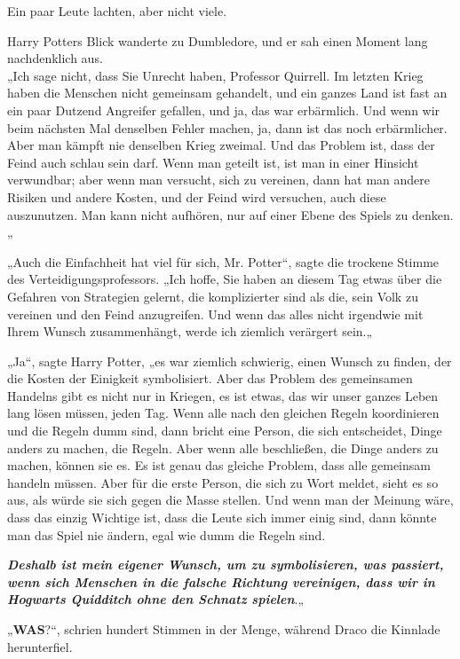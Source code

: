 {Ein paar Leute lachten, aber nicht viele.

Harry Potters Blick wanderte zu Dumbledore, und er sah einen Moment lang nachdenklich aus.\\ „Ich sage nicht, dass Sie Unrecht haben, Professor Quirrell. Im letzten Krieg haben die Menschen nicht gemeinsam gehandelt, und ein ganzes Land ist fast an ein paar Dutzend Angreifer gefallen, und ja, das war erbärmlich. Und wenn wir beim nächsten Mal denselben Fehler machen, ja, dann ist das noch erbärmlicher. Aber man kämpft nie denselben Krieg zweimal. Und das Problem ist, dass der Feind auch schlau sein darf. Wenn man geteilt ist, ist man in einer Hinsicht verwundbar; aber wenn man versucht, sich zu vereinen, dann hat man andere Risiken und andere Kosten, und der Feind wird versuchen, auch diese auszunutzen. Man kann nicht aufhören, nur auf einer Ebene des Spiels zu denken.„

„Auch die Einfachheit hat viel für sich, Mr. Potter“, sagte die trockene Stimme des Verteidigungsprofessors. „Ich hoffe, Sie haben an diesem Tag etwas über die Gefahren von Strategien gelernt, die komplizierter sind als die, sein Volk zu vereinen und den Feind anzugreifen. Und wenn das alles nicht irgendwie mit Ihrem Wunsch zusammenhängt, werde ich ziemlich verärgert sein.„

„Ja“, sagte Harry Potter, „es war ziemlich schwierig, einen Wunsch zu finden, der die Kosten der Einigkeit symbolisiert. Aber das Problem des gemeinsamen Handelns gibt es nicht nur in Kriegen, es ist etwas, das wir unser ganzes Leben lang lösen müssen, jeden Tag. Wenn alle nach den gleichen Regeln koordinieren und die Regeln dumm sind, dann bricht eine Person, die sich entscheidet, Dinge anders zu machen, die Regeln. Aber wenn alle beschließen, die Dinge anders zu machen, können sie es. Es ist genau das gleiche Problem, dass alle gemeinsam handeln müssen. Aber für die erste Person, die sich zu Wort meldet, sieht es so aus, als würde sie sich gegen die Masse stellen. Und wenn man der Meinung wäre, dass das einzig Wichtige ist, dass die Leute sich immer einig sind, dann könnte man das Spiel nie ändern, egal wie dumm die Regeln sind.

\textbf{\emph{Deshalb ist mein eigener Wunsch, um zu symbolisieren, was passiert, wenn sich Menschen in die falsche Richtung vereinigen, dass wir in Hogwarts Quidditch ohne den Schnatz spielen}}.„

„\textbf{WAS}?“, schrien hundert Stimmen in der Menge, während Draco die Kinnlade herunterfiel.

}
